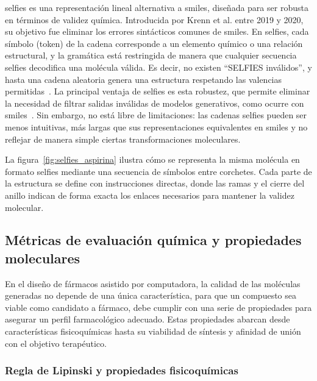 

\Gls{selfies} es una representación lineal alternativa a \gls{smiles}, diseñada para ser robusta en términos de validez química. Introducida por Krenn et al. entre 2019 y 2020, su objetivo fue eliminar los errores sintácticos comunes de \gls{smiles}. En \gls{selfies}, cada símbolo (token) de la cadena corresponde a un elemento químico o una relación estructural, y la gramática está restringida de manera que cualquier secuencia \gls{selfies} decodifica una molécula válida. Es decir, no existen ``SELFIES inválidos'', y hasta una cadena aleatoria genera una estructura respetando las valencias permitidas~\cite{Krenn2019SELFIES}. La principal ventaja de \gls{selfies} es esta robustez, que permite eliminar la necesidad de filtrar salidas inválidas de modelos generativos, como ocurre con \gls{smiles}~\cite{Krenn2019SELFIES}. Sin embargo, no está libre de limitaciones: las cadenas \gls{selfies} pueden ser menos intuitivas, más largas que sus representaciones equivalentes en \gls{smiles} y no reflejar de manera simple ciertas transformaciones moleculares.

La figura~\ref{fig:selfies_aspirina} ilustra cómo se representa la misma molécula en formato \gls{selfies} mediante una secuencia de símbolos entre corchetes. Cada parte de la estructura se define con instrucciones directas, donde las ramas y el cierre del anillo indican de forma exacta los enlaces necesarios para mantener la validez molecular.



\subsection{Métricas de evaluación química y propiedades moleculares}
\label{subsec:metricas_evaluacion}

En el diseño de fármacos asistido por computadora, la calidad de las moléculas generadas no depende de una única característica, para que un compuesto sea viable como candidato a fármaco, debe cumplir con una serie de propiedades para asegurar un perfil farmacológico adecuado. Estas propiedades abarcan desde características fisicoquímicas hasta su viabilidad de síntesis y afinidad de unión con el objetivo terapéutico. 

\subsubsection{Regla de Lipinski y propiedades fisicoquímicas}
\label{subsec:lipinski}

